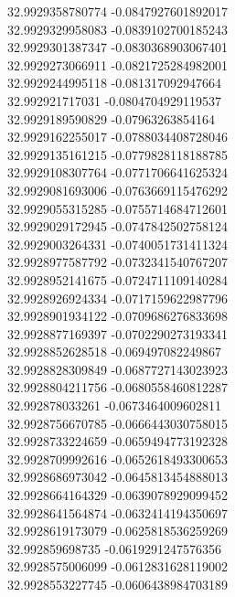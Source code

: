 {32.9929358780774	-0.0847927601892017\\
32.9929329958083	-0.0839102700185243\\
32.9929301387347	-0.0830368903067401\\
32.9929273066911	-0.0821725284982001\\
32.9929244995118	-0.081317092947664\\
32.992921717031	-0.0804704929119537\\
32.9929189590829	-0.07963263854164\\
32.9929162255017	-0.0788034408728046\\
32.9929135161215	-0.0779828118188785\\
32.9929108307764	-0.0771706641625324\\
32.9929081693006	-0.0763669115476292\\
32.9929055315285	-0.0755714684712601\\
32.9929029172945	-0.0747842502758124\\
32.9929003264331	-0.0740051731411324\\
32.9928977587792	-0.0732341540767207\\
32.9928952141675	-0.0724711109140284\\
32.9928926924334	-0.0717159622987796\\
32.9928901934122	-0.0709686276833698\\
32.9928877169397	-0.0702290273193341\\
32.9928852628518	-0.069497082249867\\
32.9928828309849	-0.0687727143023923\\
32.9928804211756	-0.0680558460812287\\
32.992878033261	-0.0673464009602811\\
32.9928756670785	-0.0666443030758015\\
32.9928733224659	-0.0659494773192328\\
32.9928709992616	-0.0652618493300653\\
32.9928686973042	-0.0645813454888013\\
32.9928664164329	-0.0639078929099452\\
32.9928641564874	-0.0632414194350697\\
32.9928619173079	-0.0625818536259269\\
32.992859698735	-0.0619291247576356\\
32.9928575006099	-0.0612831628119002\\
32.9928553227745	-0.0606438984703189\\
}

